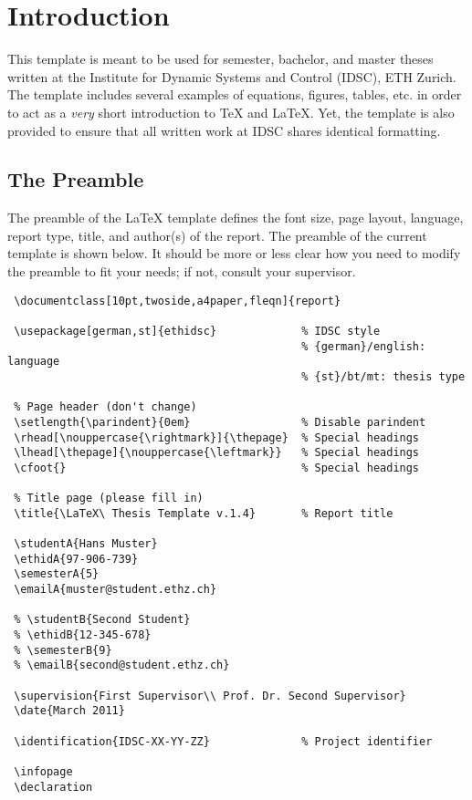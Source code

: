 \chapter{Introduction}\label{sec:introduction}
This template is meant to be used for semester, bachelor, and master theses written at the Institute for Dynamic Systems and Control (IDSC), ETH Zurich. The template includes several examples of equations, figures, tables, etc. in order to act as a {\it very} short introduction to \TeX\! and \LaTeX. Yet, the template is also provided to ensure that all written work at IDSC shares identical formatting.

\section{The Preamble}\label{sec:preamble}
The preamble of the \LaTeX\! template defines the font size, page layout, language, report type, title, and author(s) of the report. The preamble of the current template is shown below. It should be more or less clear how you need to modify the preamble to fit your needs; if not, consult your supervisor.
\begin{verbatim}
 \documentclass[10pt,twoside,a4paper,fleqn]{report}

 \usepackage[german,st]{ethidsc}             % IDSC style
                                             % {german}/english: language
                                             % {st}/bt/mt: thesis type

 % Page header (don't change)
 \setlength{\parindent}{0em}                 % Disable parindent
 \rhead[\nouppercase{\rightmark}]{\thepage}  % Special headings
 \lhead[\thepage]{\nouppercase{\leftmark}}   % Special headings
 \cfoot{}                                    % Special headings

 % Title page (please fill in)
 \title{\LaTeX\ Thesis Template v.1.4}       % Report title

 \studentA{Hans Muster}
 \ethidA{97-906-739}
 \semesterA{5}
 \emailA{muster@student.ethz.ch}

 % \studentB{Second Student}
 % \ethidB{12-345-678}
 % \semesterB{9}
 % \emailB{second@student.ethz.ch}

 \supervision{First Supervisor\\ Prof. Dr. Second Supervisor}
 \date{March 2011}

 \identification{IDSC-XX-YY-ZZ}              % Project identifier

 \infopage
 \declaration
 \end{verbatim}

